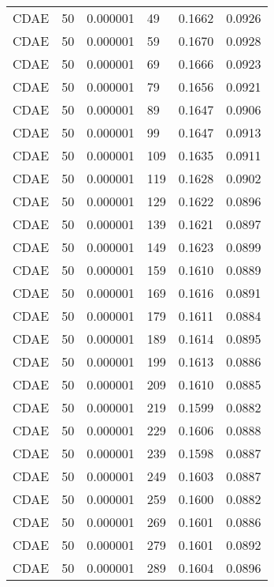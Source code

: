 \begin{tabular}{llrlrr}
    CDAE &   50 &  0.000001 &    49 &  0.1662 &       0.0926 \\
    CDAE &   50 &  0.000001 &    59 &  0.1670 &       0.0928 \\
    CDAE &   50 &  0.000001 &    69 &  0.1666 &       0.0923 \\
    CDAE &   50 &  0.000001 &    79 &  0.1656 &       0.0921 \\
    CDAE &   50 &  0.000001 &    89 &  0.1647 &       0.0906 \\
    CDAE &   50 &  0.000001 &    99 &  0.1647 &       0.0913 \\
    CDAE &   50 &  0.000001 &   109 &  0.1635 &       0.0911 \\
    CDAE &   50 &  0.000001 &   119 &  0.1628 &       0.0902 \\
    CDAE &   50 &  0.000001 &   129 &  0.1622 &       0.0896 \\
    CDAE &   50 &  0.000001 &   139 &  0.1621 &       0.0897 \\
    CDAE &   50 &  0.000001 &   149 &  0.1623 &       0.0899 \\
    CDAE &   50 &  0.000001 &   159 &  0.1610 &       0.0889 \\
    CDAE &   50 &  0.000001 &   169 &  0.1616 &       0.0891 \\
    CDAE &   50 &  0.000001 &   179 &  0.1611 &       0.0884 \\
    CDAE &   50 &  0.000001 &   189 &  0.1614 &       0.0895 \\
    CDAE &   50 &  0.000001 &   199 &  0.1613 &       0.0886 \\
    CDAE &   50 &  0.000001 &   209 &  0.1610 &       0.0885 \\
    CDAE &   50 &  0.000001 &   219 &  0.1599 &       0.0882 \\
    CDAE &   50 &  0.000001 &   229 &  0.1606 &       0.0888 \\
    CDAE &   50 &  0.000001 &   239 &  0.1598 &       0.0887 \\
    CDAE &   50 &  0.000001 &   249 &  0.1603 &       0.0887 \\
    CDAE &   50 &  0.000001 &   259 &  0.1600 &       0.0882 \\
    CDAE &   50 &  0.000001 &   269 &  0.1601 &       0.0886 \\
    CDAE &   50 &  0.000001 &   279 &  0.1601 &       0.0892 \\
    CDAE &   50 &  0.000001 &   289 &  0.1604 &       0.0896 \\

\end{tabular}
